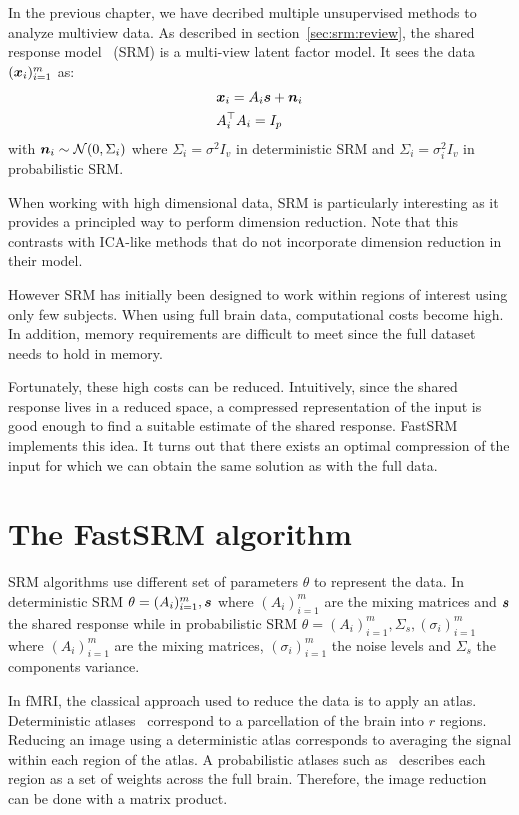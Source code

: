 In the previous chapter, we have decribed multiple unsupervised methods to analyze
multiview data.
As described in section~\ref{sec:srm:review}, the shared response
model~\cite{chen2015reduced} (SRM) is a multi-view latent factor model. It sees
the data $(\boldsymbol{x}_i)_{i=1}^m$ as:
\begin{align}
  &\boldsymbol{x}_i = A_i \boldsymbol{s} + \boldsymbol{n}_i \\
  &A_i^{\top}A_i = I_p
    \label{eq:model:srm}
\end{align}
with $\boldsymbol{n}_i \sim \mathcal{N}(0, \Sigma_i)$ where $\Sigma_i = \sigma^2 I_v$ in
deterministic SRM and $\Sigma_i = \sigma_i^2 I_v$ in probabilistic SRM.

When working with high dimensional data, SRM is particularly
interesting as it provides a principled way to perform dimension reduction. Note that this
contrasts with ICA-like methods that do not incorporate dimension reduction in their model.

However SRM has initially been designed to work within regions of interest using
only few subjects. When using full brain data, computational costs become
high. In addition, memory requirements are difficult to meet since the full dataset needs to hold
in memory.

Fortunately, these high costs can be reduced. Intuitively, since the shared
response lives in a reduced space, a compressed representation of the input is
good enough to find a suitable estimate of the shared response.
FastSRM implements this idea. It turns out that there exists an optimal
compression of the input for which we can obtain the same solution as
with the full data.

\section{The FastSRM algorithm}
SRM algorithms use different set of parameters $\theta$ to represent the data.
In deterministic SRM $\theta = (A_i)_{i=1}^m, \boldsymbol{s}$ where $(A_i)_{i=1}^m$ are the
mixing matrices and $\boldsymbol{s}$ the shared response while in probabilistic SRM $\theta
= (A_i)_{i=1}^m, \Sigma_s, (\sigma_i)_{i=1}^m$ where $(A_i)_{i=1}^m$ are the
mixing matrices, $(\sigma_i)_{i=1}^m$ the noise levels and $\Sigma_s$ the
components variance.

In fMRI, the classical approach used to reduce the data is to apply an atlas.
Deterministic atlases~\cite{bellec2010multi} correspond to a parcellation of the
brain into $r$ regions. Reducing an image using a deterministic atlas corresponds to
averaging the signal within each region of the atlas. A probabilistic atlases such
as~\cite{dadi_fine-grain_2020} describes each region as a set of weights across
the full brain. Therefore, the image reduction can be done with a matrix product.

